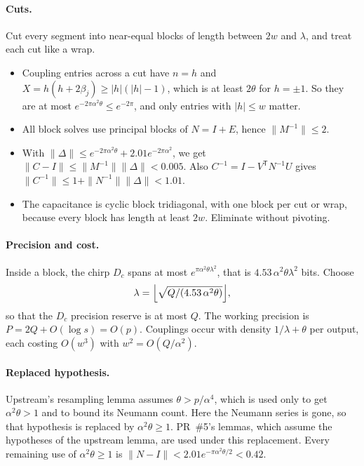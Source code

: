 \documentclass[11pt]{article}
\theoremstyle{remark}\newtheorem*{remark}{Remark}
\begin{document}
\paragraph{Cuts.} Cut every segment into near-equal blocks of length between $2w$ and
$\lambda$, and treat each cut like a wrap.
\begin{itemize}
\item Coupling entries across a cut have $n=h$ and $X=h(h+2\beta_j)\ge|h|(|h|-1)$, which is
at least $2\theta$ for $h=\pm1$. So they are at most $e^{-2\pi\alpha^2\theta}\le e^{-2\pi}$, and
only entries with $|h|\le w$ matter.
\item All block solves use principal blocks of $N=I+E$, hence $\|M^{-1}\|\le2$.
\item With $\|\Delta\|\le e^{-2\pi\alpha^2\theta}+2.01e^{-2\pi\alpha^2}$, we get
$\|C-I\|\le\|M^{-1}\|\|\Delta\|<0.005$. Also $C^{-1}=I-V^{\mathsf T}N^{-1}U$ gives
$\|C^{-1}\|\le1+\|N^{-1}\|\|\Delta\|<1.01$.
\item The capacitance is cyclic block tridiagonal, with one block per cut or wrap, because
every block has length at least $2w$. Eliminate without pivoting.
\end{itemize}

\paragraph{Precision and cost.} Inside a block, the chirp $D_c$ spans at most
$e^{\pi\alpha^2\theta\lambda^2}$, that is $4.53\,\alpha^2\theta\lambda^2$ bits. Choose
\[
 \lambda=\Bigl\lfloor\sqrt{Q/(4.53\,\alpha^2\theta)}\Bigr\rfloor,
\]
so that the $D_c$ precision reserve is at most $Q$. The working precision is $P=2Q+O(\log s)=O(p)$. Couplings occur with density
$1/\lambda+\theta$ per output, each costing $O(w^3)$ with $w^2=O(Q/\alpha^2)$.

\paragraph{Replaced hypothesis.} Upstream's resampling lemma assumes $\theta>p/\alpha^4$, which is used only
to get $\alpha^2\theta>1$ and to bound its Neumann count. Here the Neumann series is gone, so that
hypothesis is replaced by $\alpha^2\theta\ge1$. PR~\#5's lemmas, which assume the hypotheses of the
upstream lemma, are used under this replacement. Every remaining use of $\alpha^2\theta\ge1$ is
$\|N-I\|<2.01e^{-\pi\alpha^2\theta/2}<0.42$.
\end{document}
